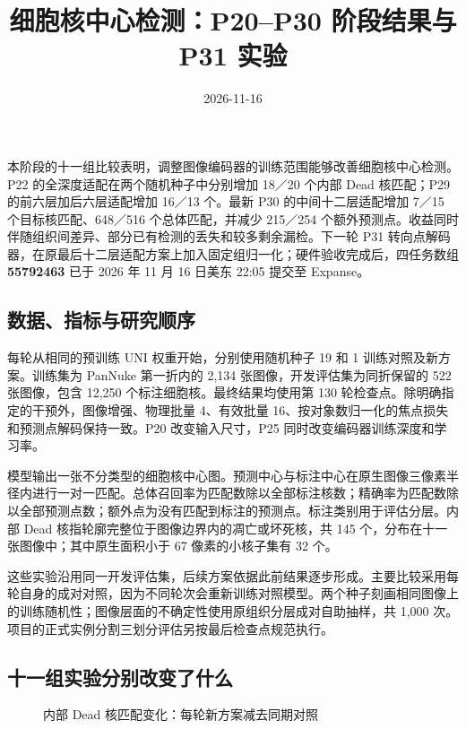 \documentclass[
  11pt,
  fontset=fandol]{ctexart}
\title{细胞核中心检测：P20--P30 阶段结果与 P31 实验}
\author{}
\date{2026-11-16}
\begin{document}
\maketitle

{
\setcounter{tocdepth}{2}
\tableofcontents
}
本阶段的十一组比较表明，调整图像编码器的训练范围能够改善细胞核中心检测。P22
的全深度适配在两个随机种子中分别增加 18／20 个内部 Dead 核匹配；P29
的前六层加后六层适配增加 16／13 个。最新 P30 的中间十二层适配增加 7／15
个目标核匹配、648／516 个总体匹配，并减少 215／254
个额外预测点。收益同时伴随组织间差异、部分已有检测的丢失和较多剩余漏检。下一轮
P31
转向点解码器，在原最后十二层适配方案上加入固定组归一化；硬件验收完成后，四任务数组
\textbf{55792463} 已于 2026 年 11 月 16 日美东 22:05 提交至 Expanse。

\subsection{数据、指标与研究顺序}\label{ux6570ux636eux6307ux6807ux4e0eux7814ux7a76ux987aux5e8f}

每轮从相同的预训练 UNI 权重开始，分别使用随机种子 19 和 1
训练对照及新方案。训练集为 PanNuke 第一折内的 2,134
张图像，开发评估集为同折保留的 522 张图像，包含 12,250
个标注细胞核。最终结果均使用第 130
轮检查点。除明确指定的干预外，图像增强、物理批量 4、有效批量
16、按对象数归一化的焦点损失和预测点解码保持一致。P20 改变输入尺寸，P25
同时改变编码器训练深度和学习率。

模型输出一张不分类型的细胞核中心图。预测中心与标注中心在原生图像三像素半径内进行一对一匹配。总体召回率为匹配数除以全部标注核数；精确率为匹配数除以全部预测点数；额外点为没有匹配到标注的预测点。标注类别用于评估分层。内部
Dead 核指轮廓完整位于图像边界内的凋亡或坏死核，共 145
个，分布在十一张图像中；其中原生面积小于 67 像素的小核子集有 32 个。

这些实验沿用同一开发评估集，后续方案依据此前结果逐步形成。主要比较采用每轮自身的成对对照，因为不同轮次会重新训练对照模型。两个种子刻画相同图像上的训练随机性；图像层面的不确定性使用原组织分层成对自助抽样，共
1,000 次。项目的正式实例分割三划分评估另按最后检查点规范执行。

\subsection{十一组实验分别改变了什么}\label{ux5341ux4e00ux7ec4ux5b9eux9a8cux5206ux522bux6539ux53d8ux4e86ux4ec0ux4e48}

\begin{figure}[H]\centering

\caption{内部 Dead 核匹配变化：每轮新方案减去同期对照}
\end{figure}
\end{document}
